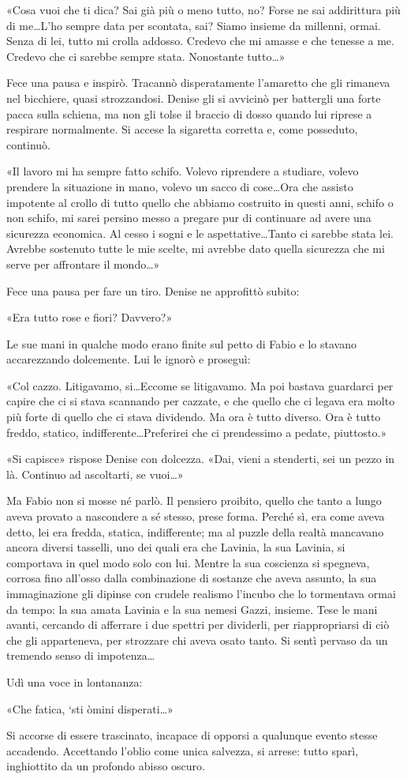 «Cosa vuoi che ti dica? Sai già più o meno tutto, no? Forse ne sai addirittura più di me\ldots L'ho sempre data per scontata, sai? Siamo insieme da millenni, ormai. Senza di lei, tutto mi crolla addosso. Credevo che mi amasse e che tenesse a me. Credevo che ci sarebbe sempre stata. Nonostante tutto\ldots»

Fece una pausa e inspirò. Tracannò disperatamente l'amaretto che gli rimaneva nel bicchiere, quasi strozzandosi. Denise gli si avvicinò per battergli una forte pacca sulla schiena, ma non gli tolse il braccio di dosso quando lui riprese a respirare normalmente. Si accese la sigaretta corretta e, come posseduto, continuò.

«Il lavoro mi ha sempre fatto schifo. Volevo riprendere a studiare, volevo prendere la situazione in mano, volevo un sacco di cose\ldots Ora che assisto impotente al crollo di tutto quello che abbiamo costruito in questi anni, schifo o non schifo, mi sarei persino messo a pregare pur di continuare ad avere una sicurezza economica. Al cesso i sogni e le aspettative\ldots Tanto ci sarebbe stata lei. Avrebbe sostenuto tutte le mie scelte, mi avrebbe dato quella sicurezza che mi serve per affrontare il mondo\ldots»

Fece una pausa per fare un tiro. Denise ne approfittò subito:

«Era tutto rose e fiori? Davvero?»

Le sue mani in qualche modo erano finite sul petto di Fabio e lo stavano accarezzando dolcemente. Lui le ignorò e proseguì:

«Col cazzo. Litigavamo, si\ldots Eccome se litigavamo. Ma poi bastava guardarci per capire che ci si stava scannando per cazzate, e che quello che ci legava era molto più forte di quello che ci stava dividendo. Ma ora è tutto diverso. Ora è tutto freddo, statico, indifferente\ldots Preferirei che ci prendessimo a pedate, piuttosto.»

«Si capisce» rispose Denise con dolcezza. «Dai, vieni a stenderti, sei un pezzo in là. Continuo ad ascoltarti, se vuoi\ldots»

Ma Fabio non si mosse né parlò. Il pensiero proibito, quello che tanto a lungo aveva provato a nascondere a sé stesso, prese forma. Perché sì, era come aveva detto, lei era fredda, statica, indifferente; ma al puzzle della realtà mancavano ancora diversi tasselli, uno dei quali era che Lavinia, la sua Lavinia, si comportava in quel modo solo con lui. Mentre la sua coscienza si spegneva, corrosa fino all'osso dalla combinazione di sostanze che aveva assunto, la sua immaginazione gli dipinse con crudele realismo l'incubo che lo tormentava ormai da tempo: la sua amata Lavinia e la sua nemesi Gazzi, insieme. Tese le mani avanti, cercando di afferrare i due spettri per dividerli, per riappropriarsi di ciò che gli apparteneva, per strozzare chi aveva osato tanto. Si sentì pervaso da un tremendo senso di impotenza\ldots

Udì una voce in lontananza:

«Che fatica, `sti òmini disperati\ldots»

Si accorse di essere trascinato, incapace di opporsi a qualunque evento stesse accadendo. Accettando l'oblio come unica salvezza, si arrese: tutto sparì, inghiottito da un profondo abisso oscuro.
